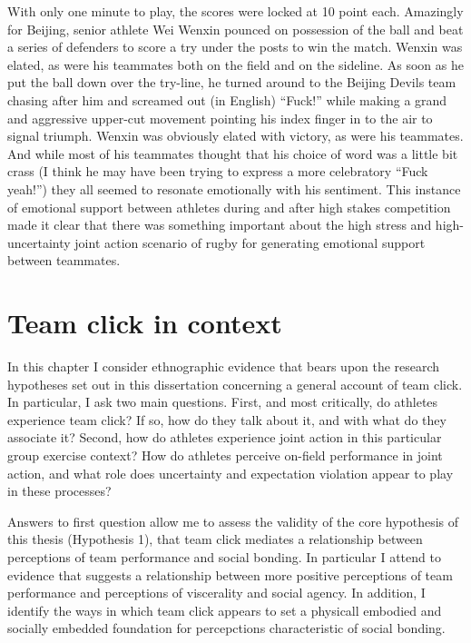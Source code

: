 \begin{CJK}{UTF8}{gbsn}
With only one minute to play, the scores were locked at 10 point each.  Amazingly for Beijing, senior athlete Wei Wenxin pounced on possession of the ball and beat a series of defenders to score a try under the posts to win the match.  Wenxin was elated, as were his teammates both on the field and on the sideline.  As soon as he put the ball down over the try-line, he turned around to the Beijing Devils team chasing after him and screamed out (in English) ``Fuck!'' while making a grand and aggressive upper-cut movement pointing his index finger in to the air to signal triumph.  Wenxin was obviously elated with victory, as were his teammates. And while most of his teammates thought that his choice of word was a little bit crass (I think he may have been trying to express a more celebratory ``Fuck yeah!'') they all seemed to resonate emotionally with his sentiment.  This instance of emotional support between athletes during and after high stakes competition made it clear that there was something important about the high stress and high-uncertainty joint action scenario of rugby for generating emotional support between teammates.








\section{Team click in context}
In this chapter I consider ethnographic evidence that bears upon the research hypotheses set out in this dissertation concerning a general account of team click.  In particular, I ask two main questions.  First, and most critically, do athletes experience team click? If so, how do they talk about it, and with what do they associate it?  Second, how do athletes experience joint action in this particular group exercise context?  How do athletes perceive on-field performance in joint action, and what role does uncertainty and expectation violation appear to play in these processes?

Answers to first question allow me to assess the validity of the core hypothesis of this thesis (Hypothesis 1), that team click mediates a relationship between perceptions of team performance and social bonding. In particular I attend to evidence that suggests a relationship between more positive perceptions of team performance and perceptions of viscerality and social agency. In addition, I identify the ways in which team click appears to set a physicall embodied and socially embedded foundation for percepctions characteristic of social bonding.


\end{CJK}

